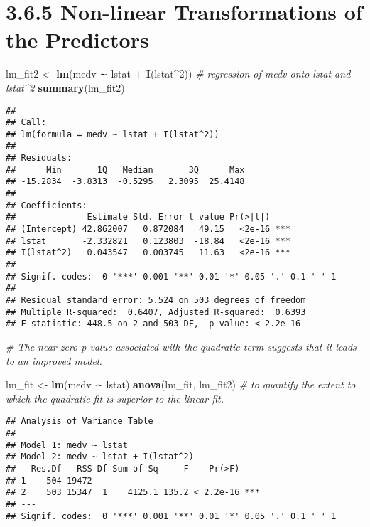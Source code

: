 \documentclass[]{article}
\newenvironment{Shaded}{\begin{snugshade}}{\end{snugshade}}
\newcommand{\CommentTok}[1]{\textcolor[rgb]{0.56,0.35,0.01}{\textit{#1}}}
\newcommand{\DecValTok}[1]{\textcolor[rgb]{0.00,0.00,0.81}{#1}}
\newcommand{\KeywordTok}[1]{\textcolor[rgb]{0.13,0.29,0.53}{\textbf{#1}}}
\newcommand{\NormalTok}[1]{#1}
\newcommand{\OperatorTok}[1]{\textcolor[rgb]{0.81,0.36,0.00}{\textbf{#1}}}
\newcommand{\StringTok}[1]{\textcolor[rgb]{0.31,0.60,0.02}{#1}}
\begin{document}
\hypertarget{non-linear-transformations-of-the-predictors}{%
\section{3.6.5 Non-linear Transformations of the
Predictors}\label{non-linear-transformations-of-the-predictors}}

\begin{Shaded}
\begin{Highlighting}[]
\NormalTok{lm_fit2 <-}\StringTok{ }\KeywordTok{lm}\NormalTok{(medv ∼ lstat }\OperatorTok{+}\StringTok{ }\KeywordTok{I}\NormalTok{(lstat}\OperatorTok{^}\DecValTok{2}\NormalTok{)) }\CommentTok{# regression of medv onto lstat and lstat^2}
\KeywordTok{summary}\NormalTok{(lm_fit2) }
\end{Highlighting}
\end{Shaded}

\begin{verbatim}
## 
## Call:
## lm(formula = medv ~ lstat + I(lstat^2))
## 
## Residuals:
##      Min       1Q   Median       3Q      Max 
## -15.2834  -3.8313  -0.5295   2.3095  25.4148 
## 
## Coefficients:
##              Estimate Std. Error t value Pr(>|t|)    
## (Intercept) 42.862007   0.872084   49.15   <2e-16 ***
## lstat       -2.332821   0.123803  -18.84   <2e-16 ***
## I(lstat^2)   0.043547   0.003745   11.63   <2e-16 ***
## ---
## Signif. codes:  0 '***' 0.001 '**' 0.01 '*' 0.05 '.' 0.1 ' ' 1
## 
## Residual standard error: 5.524 on 503 degrees of freedom
## Multiple R-squared:  0.6407, Adjusted R-squared:  0.6393 
## F-statistic: 448.5 on 2 and 503 DF,  p-value: < 2.2e-16
\end{verbatim}

\begin{Shaded}
\begin{Highlighting}[]
\CommentTok{# The near-zero p-value associated with the quadratic term suggests that it leads to an improved model.}

\NormalTok{lm_fit <-}\StringTok{ }\KeywordTok{lm}\NormalTok{(medv ∼ lstat) }
\KeywordTok{anova}\NormalTok{(lm_fit, lm_fit2) }\CommentTok{# to quantify the extent to which the quadratic fit is superior to the linear fit.}
\end{Highlighting}
\end{Shaded}

\begin{verbatim}
## Analysis of Variance Table
## 
## Model 1: medv ~ lstat
## Model 2: medv ~ lstat + I(lstat^2)
##   Res.Df   RSS Df Sum of Sq     F    Pr(>F)    
## 1    504 19472                                 
## 2    503 15347  1    4125.1 135.2 < 2.2e-16 ***
## ---
## Signif. codes:  0 '***' 0.001 '**' 0.01 '*' 0.05 '.' 0.1 ' ' 1
\end{verbatim}
\end{document}
